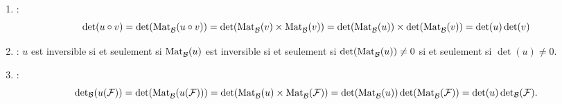 \documentclass{book}
\begin{document}
\begin{Demonstration}

\begin{enumerate}
\item {} : 
$$\det(u \circ v ) =\det(\uMat{\mathcal{B}}{}{u \circ v})=\det(\uMat{\mathcal{B}}{}{v}\times \uMat{\mathcal{B}}{}{ v})=\det(\uMat{\mathcal{B}}{}{u})\times \det(\uMat{\mathcal{B}}{}{v})=\det (u) \det(v ) $$
\item {} : 
$u$ est inversible si et seulement si $\uMat{\mathcal{B}}{}{u}$ est inversible si et seulement si $\det(\uMat{\mathcal{B}}{}{u})\neq 0$  si et seulement si $\det(u)\neq 0$.
\item {} :
$$\det_{\mathcal{B}}(u(\mathcal{F}))=\det( \uMat{\mathcal{B}}{}{u(\mathcal{F})})=\det( \uMat{\mathcal{B}}{}{u}\times \uMat{\mathcal{B}}{}{\mathcal{F}})=\det( \uMat{\mathcal{B}}{}{u}) \det(\uMat{\mathcal{B}}{}{\mathcal{F}})=\det(u)\det_{\mathcal{B}}(\mathcal{F}).$$
\end{enumerate}
\end{Demonstration}
%
\end{document}
